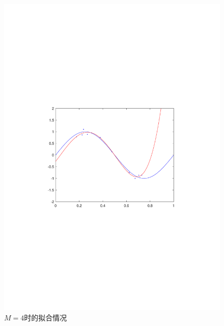 \documentclass{article}
\begin{document}
\begin{homeworkProblem}
\begin{figure}[htbp]
\begin{minipage}{0.49\linewidth}
			\includegraphics[width=0.9\linewidth]{images/title/M=4.pdf}
			\caption{$M=4$时的拟合情况}
			\label{M=4}%
		\end{minipage}

		

\end{figure}
\end{homeworkProblem}
\end{document}

